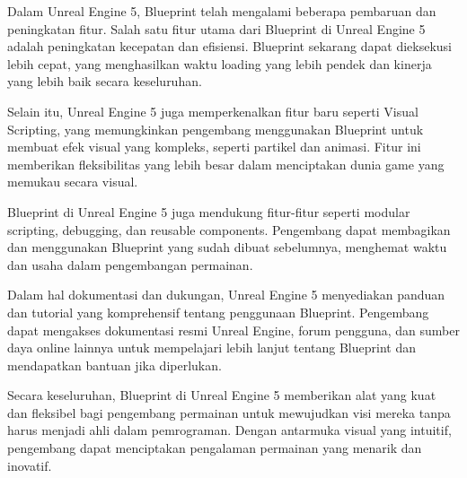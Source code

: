 Dalam Unreal Engine 5, Blueprint telah mengalami beberapa pembaruan dan peningkatan fitur. Salah satu fitur utama dari Blueprint di Unreal Engine 5 adalah peningkatan kecepatan dan efisiensi. Blueprint sekarang dapat dieksekusi 
lebih cepat, yang menghasilkan waktu loading yang lebih pendek dan kinerja yang lebih baik secara keseluruhan.

Selain itu, Unreal Engine 5 juga memperkenalkan fitur baru seperti Visual Scripting, yang memungkinkan pengembang menggunakan Blueprint untuk membuat efek visual yang kompleks, seperti partikel dan animasi. Fitur ini memberikan 
fleksibilitas yang lebih besar dalam menciptakan dunia game yang memukau secara visual. \parencite{unrealengine}

Blueprint di Unreal Engine 5 juga mendukung fitur-fitur seperti modular scripting, debugging, dan reusable components. Pengembang dapat membagikan dan menggunakan Blueprint yang sudah dibuat sebelumnya, menghemat waktu dan 
usaha dalam pengembangan permainan.

Dalam hal dokumentasi dan dukungan, Unreal Engine 5 menyediakan panduan dan tutorial yang komprehensif tentang penggunaan Blueprint. Pengembang dapat mengakses dokumentasi resmi Unreal Engine, forum pengguna, dan sumber 
daya online lainnya untuk mempelajari lebih lanjut tentang Blueprint dan mendapatkan bantuan jika diperlukan.

Secara keseluruhan, Blueprint di Unreal Engine 5 memberikan alat yang kuat dan fleksibel bagi pengembang permainan untuk mewujudkan visi mereka tanpa harus menjadi ahli dalam pemrograman. Dengan antarmuka visual yang 
intuitif, pengembang dapat menciptakan pengalaman permainan yang menarik dan inovatif. \parencite{unrealengine5}
